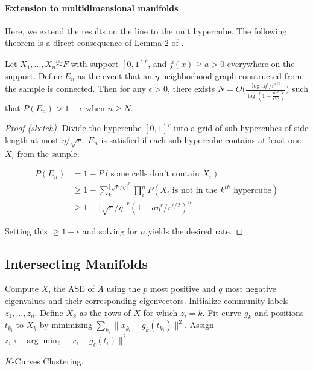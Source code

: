 \documentclass[12pt]{article}
\begin{document}
\hypertarget{extension-to-multidimensional-manifolds}{%
\paragraph{Extension to multidimensional
manifolds}\label{extension-to-multidimensional-manifolds}}

Here, we extend the results on the line to the unit hypercube. The
following theorem is a direct consequence of Lemma 2 of
\citet{trosset2020rehabilitating}.

\begin{theorem}
\label{thm:multidim}
Let $X_1, ..., X_n \stackrel{\mathrm{iid}}{\sim}F$ with support $[0, 1]^r$, and $f(x) \geq a > 0$ everywhere on the support. 
Define $E_n$ as the event that an $\eta$-neighborhood graph constructed from the sample is connected. 
Then for any $\epsilon > 0$, there exists $N = O \bigg( \frac{\log \epsilon \eta^r / r^{r/2}}{\log (1 - \frac{a \eta^r}{r^{r / 2}})} \bigg)$ such that $P(E_n) > 1 - \epsilon$ when $n \geq N$.
\end{theorem}

\begin{proof}[Proof (sketch)]
Divide the hypercube $[0, 1]^r$ into a grid of sub-hypercubes of side length at most $\eta / \sqrt{r}$. 
$E_n$ is satisfied if each sub-hypercube contains at least one $X_i$ from the sample. 

$$
\begin{aligned}
P(E_n) & = 1 - P(\text{some cells don't contain } X_i) \\
& \geq 1 - \sum_k^{\lceil \sqrt{r} / \eta \rceil^r} \prod_i^n P(X_i \text{ is not in the } k^{th} \text{ hypercube}) \\
& \geq 1 - \lceil \sqrt{r} / \eta \rceil^r (1 - a \eta^r / r^{r/2})^n
\end{aligned}
$$

Setting this $\geq 1 - \epsilon$ and solving for $n$ yields the desired rate. 
\end{proof}

\hypertarget{intersecting-manifolds}{%
\subsection{Intersecting Manifolds}\label{intersecting-manifolds}}

\begin{algorithm}[h]
\DontPrintSemicolon
\SetAlgoLined
{}
Compute $X$, the ASE of $A$ using the $p$ most positive and $q$ most negative eigenvalues and their corresponding eigenvectors.\;
Initialize community labels $z_1, ..., z_n$.\;
 {
 {
Define $X_k$ as the rows of $X$ for which $z_i = k$.\;
Fit curve $g_k$ and positions $t_{k_i}$ to $X_k$ by minimizing $\sum_{k_i} \|x_{k_i} - g_k(t_{k_i})\|^2$.\;
}
 {
Assign $z_i \leftarrow \arg\min_\ell \|x_i - g_\ell(t_i)\|^2$.\
}
}
\caption{$K$-Curves Clustering.}
\end{algorithm}
\end{document}
